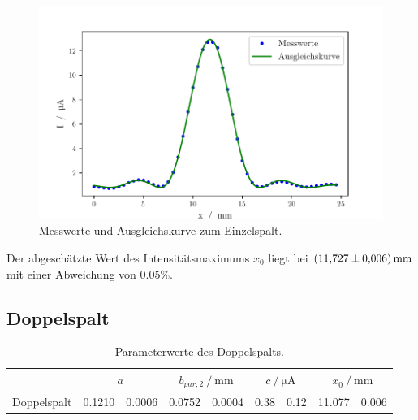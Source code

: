 \begin{figure}
    \centering
    \includegraphics[width=.9\textwidth]{python/EinzelspaltFit.pdf}
    \caption{Messwerte und Ausgleichskurve zum Einzelspalt.}
    \label{fig:messEinzel}
\end{figure}

Der abgeschätzte Wert des Intensitätsmaximums $x_0$ liegt bei $\SI{11.727 \pm 0.006}{\milli\meter}$ mit einer Abweichung von $0.05\%$.

\subsection{Doppelspalt}
\begin{table}
    \centering
    \caption{Parameterwerte des Doppelspalts.}
    \label{tab:parDoppel}
    \begin{tabular}{c S[table-format=1.4]@{\,\( \pm \)\,}S[table-format=1.4] 
        S[table-format=1.5]@{\,\( \pm \)\,}S[table-format=1.5] 
        S[table-format=1.2]@{\,\( \pm \)\,}S[table-format=1.2]
        S[table-format=1.3]@{\,\( \pm \)\,}S[table-format=1.3]}
        \toprule
        &  &  &  &  \\
        \midrule
        Doppelspalt & 0.1210&0.0006 & 0.0752&0.0004 & 0.38&0.12 & 11.077&0.006 \\
    \end{tabular}
\end{table}

